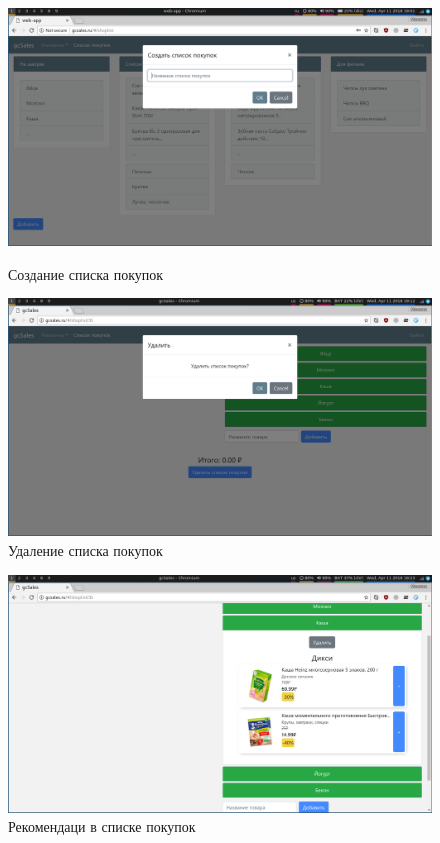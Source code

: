 \begin{figure}[h!]
    \centering
    \includegraphics[width=\textwidth]{./screenshots/create_shoplist.png}
    \caption{Создание списка покупок}
    \endminipage\hfill
    \includegraphics[width=\textwidth]{./screenshots/delete_shoplist.png}
    \caption{Удаление списка покупок}
    \endminipage
\end{figure}

\begin{figure}[h!]
    \centering
    \includegraphics[width=\textwidth]{./screenshots/custom_item.png}
    \caption{Рекомендаци в списке покупок}
\end{figure}

